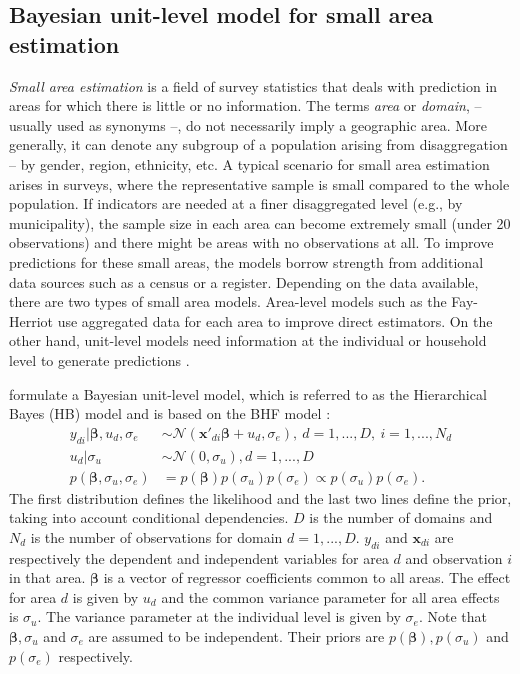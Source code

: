 \subsection{Bayesian unit-level model for small area estimation}

\textit{Small area estimation} is a field of survey statistics that deals with prediction in areas for which there is little or no information.
The terms \textit{area} or \textit{domain}, – usually used as synonyms –, do not necessarily imply a geographic area.
More generally, it can denote any subgroup of a population arising from disaggregation – by gender, region, ethnicity, etc.
A typical scenario for small area estimation arises in surveys, where the representative sample is small compared to the whole population.
If indicators are needed at a finer disaggregated level (e.g., by municipality), the sample size in each area can become extremely small (under 20 observations) and there might be areas with no observations at all.
To improve predictions for these small areas, the models borrow strength from additional data sources such as a census or a register.
Depending on the data available, there are two types of small area models.
Area-level models such as the Fay-Herriot use aggregated data for each area to improve direct estimators.
On the other hand, unit-level models need information at the individual or household level to generate predictions \citep[Chapter 1 and 2]{rao_small_2015}.

\cite{molina_small_2014} formulate a Bayesian unit-level model, which is referred to as the Hierarchical Bayes (HB) model and is based on the BHF model \citep{battese_error_1988}:
\begin{equation}
    \label{eq:hb_rao}
	\begin{split}
	y_{di} |\boldsymbol \beta, u_d, \sigma_e & \sim \mathcal N(\boldsymbol{x'}_{di} \boldsymbol{\beta}+ u_d, \sigma_e), ~ d = 1, ..., D, ~ i = 1, ..., N_d \\
	u_d | \sigma_u & \sim \mathcal N(0, \sigma_u), d = 1, ..., D \\
	p(\boldsymbol \beta, \sigma_u, \sigma_e) & = p(\boldsymbol \beta) p(\sigma_u)p(\sigma_e) \propto p(\sigma_u)p(\sigma_e).
	\end{split}
\end{equation}
The first distribution defines the likelihood and the last two lines define the prior, taking into account conditional dependencies.
$D$ is the number of domains and $N_d$ is the number of observations for domain $d = 1, ..., D$. $y_{di}$ and $\boldsymbol{x}_{di}$ are respectively the dependent and independent variables for area $d$ and observation $i$ in that area.
$\boldsymbol \beta$ is a vector of regressor coefficients common to all areas.
The effect for area $d$ is given by $u_d$ and the common variance parameter for all area effects is $\sigma_u$.
The variance parameter at the individual level is given by $\sigma_e$.
Note that $\boldsymbol \beta, \sigma_u$ and $\sigma_e$ are assumed to be independent.
Their priors are $p(\boldsymbol \beta), p(\sigma_u)$ and $p(\sigma_e)$ respectively.

